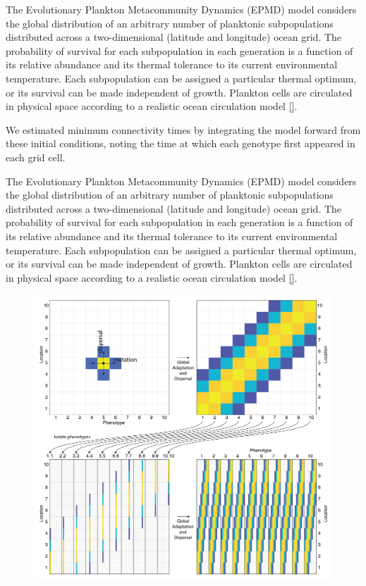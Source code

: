 \documentclass[12pt]{article}
\begin{document}
The Evolutionary Plankton Metacommunity Dynamics (EPMD) model considers the global distribution of an arbitrary number of planktonic subpopulations distributed across a two-dimensional (latitude and longitude) ocean grid. The probability of survival for each subpopulation in each generation is a function of its relative abundance and its thermal tolerance to its current environmental temperature. Each subpopulation can be assigned a particular thermal optimum, or its survival can be made independent of growth. Plankton cells are circulated in physical space according to a realistic ocean circulation model \ref{}. 



We estimated minimum connectivity times by integrating the model forward from these initial conditions, noting the time at which each genotype first appeared in each grid cell. 

The Evolutionary Plankton Metacommunity Dynamics (EPMD) model considers the global distribution of an arbitrary number of  planktonic subpopulations distributed across a two-dimensional (latitude and longitude) ocean grid. The probability of survival for each subpopulation in each generation is a function of its relative abundance and its thermal tolerance to its current environmental temperature. Each subpopulation can be assigned a particular thermal optimum, or its survival can be made independent of growth. Plankton cells are circulated in physical space according to a realistic ocean circulation model \ref{}. 


\begin{figure}[htp!]
\centering
\includegraphics[width=0.8\linewidth]{../Figures/Schematic.png}
\caption{}
\label{Schematic}
\end{figure}
\end{document}
